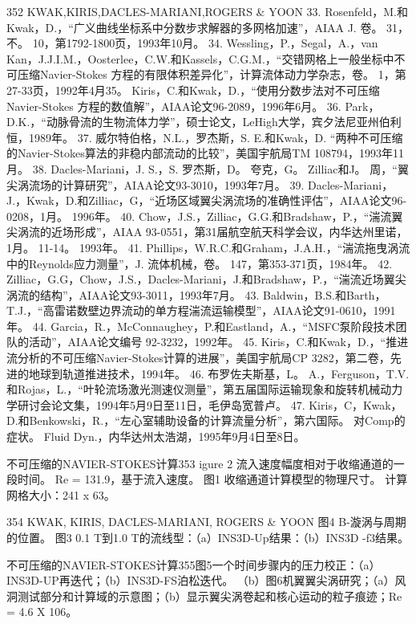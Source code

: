 \documentclass[UTF8,11pt,a4paper,openany,fontset=fandol]{ctexbook}
\begin{document}
352 KWAK,KIRIS,DACLES-MARIANI,ROGERS \& YOON 33. Rosenfeld，M.和Kwak，D.，“广义曲线坐标系中分数步求解器的多网格加速”，AIAA J. 卷。 31，不。 10，第1792-1800页，1993年10月。 34. Wessling，P.，Segal，A.，van Kan，J.J.I.M.，Oosterlee，C.W.和Kassels，C.G.M.，“交错网格上一般坐标中不可压缩Navier-Stokes 方程的有限体积差异化”，计算流体动力学杂志，卷。 1，第27-33页，1992年4月35。 Kiris，C.和Kwak，D.，“使用分数步法对不可压缩Navier-Stokes 方程的数值解”，AIAA论文96-2089，1996年6月。 36. Park，D.K.，“动脉骨流的生物流体力学”，硕士论文，LeHigh大学，宾夕法尼亚州伯利恒，1989年。 37. 威尔特伯格，N.L.，罗杰斯，S. E.和Kwak，D. “两种不可压缩的Navier-Stokes算法的非稳内部流动的比较”，美国宇航局TM 108794，1993年11月。 38. Dacles-Mariani，J. S.，S. 罗杰斯，D。 夸克，G。 Zilliac和J。 周，“翼尖涡流场的计算研究”，AIAA论文93-3010，1993年7月。 39. Dacles-Mariani，J.，Kwak，D.和Zilliac，G，“近场区域翼尖涡流场的准确性评估”，AIAA论文96-0208，1月。 1996年。 40. Chow，J.S.，Zilliac，G.G.和Bradshaw，P.，“湍流翼尖涡流的近场形成”，AIAA 93-0551，第31届航空航天科学会议，内华达州里诺，1月。 11-14。 1993年。 41. Phillips，W.R.C.和Graham，J.A.H.，“湍流拖曳涡流中的Reynolds应力测量”，J. 流体机械，卷。 147，第353-371页，1984年。 42. Zilliac，G.G，Chow，J.S.，Dacles-Mariani，J.和Bradshaw，P.，“湍流近场翼尖涡流的结构”，AIAA论文93-3011，1993年7月。 43. Baldwin，B.S.和Barth，T.J.，“高雷诺数壁边界流动的单方程湍流运输模型”，AIAA论文91-0610，1991年。 44. Garcia，R.，McConnaughey，P.和Eastland，A.，“MSFC泵阶段技术团队的活动”，AIAA论文编号 92-3232，1992年。 45. Kiris，C.和Kwak，D.，“推进流分析的不可压缩Navier-Stokes计算的进展”，美国宇航局CP 3282，第二卷，先进的地球到轨道推进技术，1994年。 46. 布罗佐夫斯基，L。 A.，Ferguson，T.V.和Rojas，L.，“叶轮流场激光测速仪测量”，第五届国际运输现象和旋转机械动力学研讨会论文集，1994年5月9日至11日，毛伊岛宽普卢。 47. Kiris，C，Kwak，D.和Benkowski，R.，“左心室辅助设备的计算流量分析”，第六国际。 对Comp的症状。 Fluid Dyn.，内华达州太浩湖，1995年9月4日至8日。

不可压缩的NAVIER-STOKES计算353 igure 2 流入速度幅度相对于收缩通道的一段时间。 Re = 131.9，基于流入速度。 图1 收缩通道计算模型的物理尺寸。 计算网格大小：241 x 63。

354 KWAK, KIRIS, DACLES-MARIANI, ROGERS \& YOON 图4 B-漩涡与周期的位置。 图3 0.1 T到1.0 T的流线型：（a）INS3D-Up结果：（b）INS3D -f3结果。

不可压缩的NAVIER-STOKES计算355图5一个时间步骤内的压力校正：（a）INS3D-UP再迭代；（b）INS3D-FS泊松迭代。 （b）图6机翼翼尖涡研究；（a）风洞测试部分和计算域的示意图；（b）显示翼尖涡卷起和核心运动的粒子痕迹；Re = 4.6 X 106。
\end{document}
